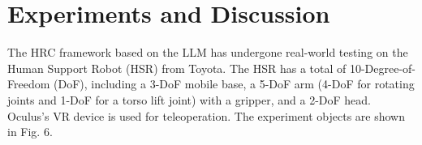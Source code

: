 \documentclass[letterpaper,conference]{ieeeconf}
\begin{document}
\section{Experiments and Discussion}
The HRC framework based on the LLM has undergone real-world testing on the Human Support Robot (HSR) from Toyota. 
The HSR has a total of 10-Degree-of-Freedom (DoF), including a 3-DoF mobile base, a 5-DoF arm (4-DoF for rotating joints and 1-DoF for a torso lift joint) with a gripper, and a 2-DoF head. 
Oculus’s VR device is used for teleoperation. The experiment objects are shown in Fig. 6.

\begin{figure}[t]
\vspace{2mm}
\centering

\hspace{3pt}
\vspace{3pt}
\hspace{3pt}
\vspace{3pt}
\end{figure}
\end{document}
